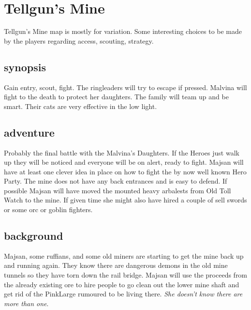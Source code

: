 \section*{Tellgun's Mine}
Tellgun's Mine map is mostly for variation. Some interesting choices to be made by the players regarding access, scouting, strategy.


\subsection*{synopsis}
Gain entry, scout, fight. The ringleaders will try to escape if pressed. Malvina will fight to the death to protect her daughters. The family will team up and be smart. Their cats are very effective in the low light.


\subsection*{adventure}
Probably the final battle with the Malvina's Daughters. If the Heroes just walk up they will be noticed and everyone will be on alert, ready to fight. Majsan will have at least one clever idea in place on how to fight the by now well known Hero Party. The mine does not have any back entrances and is easy to defend. If possible Majsan will have moved the mounted heavy arbalests from Old Toll Watch to the mine. If given time she might also have hired a couple of sell swords or some orc or goblin fighters.


\subsection*{background}
Majsan, some ruffians, and some old miners are starting to get the mine back up and running again. They know there are dangerous demons in the old mine tunnels so they have torn down the rail bridge. Majsan will use the proceeds from the already existing ore to hire people to go clean out the lower mine shaft and get rid of the PinkLarge rumoured to be living there. \textit{She doesn't know there are more than one}.


